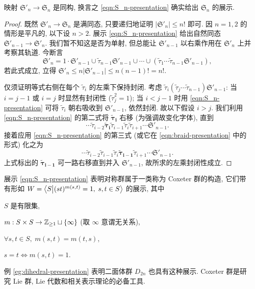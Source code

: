\begin{theorem}\label{prop:S_n-presentation}
	映射 $\mathfrak{S}'_n \to \mathfrak{S}_n$ 是同构, 换言之 \eqref{eqn:S_n-presentation} 确实给出 $\mathfrak{S}_n$ 的展示.
\end{theorem}
\begin{proof}
	既然 $\mathfrak{S}'_n \to \mathfrak{S}_n$ 是满同态, 只要递归地证明 $|\mathfrak{S}'_n| \leq n!$ 即可. 因 $n=1,2$ 的情形是平凡的, 以下设 $n > 2$. 展示 \eqref{eqn:S_n-presentation} 给出自然同态 $\mathfrak{S}'_{n-1} \to \mathfrak{S}'_n$. 我们暂不知这是否为单射, 但总能让 $\mathfrak{S}'_{n-1}$ 以右乘作用在 $\mathfrak{S}'_n$ 上并考察其轨道. 今断言
	\[ \mathfrak{S}'_n = 1 \cdot \mathfrak{S}'_{n-1} \cup \tilde{\tau}_{n-1}\mathfrak{S}'_{n-1} \cup \cdots \cup (\tilde{\tau}_1 \cdots \tilde{\tau}_{n-1} \mathfrak{S}'_{n-1}), \]
	若此式成立, 立得 $\mathfrak{S}'_n \leq n |\mathfrak{S}'_{n-1}| \leq n(n-1)! = n!$.
	
	仅须证明等式右侧在每个 $\tilde{\tau}_i$ 的左乘下保持封闭. 考虑 $\tilde{\tau}_i (\tilde{\tau}_j \cdots \tilde{\tau}_{n-1}) \mathfrak{S}'_{n-1}$: 当 $i=j-1$ 或 $i=j$ 时显然有封闭性 ($\tilde{\tau}_j^2 = 1$); 当 $i < j-1$ 时用 \eqref{eqn:S_n-presentation} 可将 $\tilde{\tau}_i$ 朝右吸收到 $\mathfrak{S}'_{n-1}$, 依然封闭. 故以下假设 $i>j$. 我们利用 \eqref{eqn:S_n-presentation} 的第二式将 $\bm{\tilde{\tau}_i}$ 右移 (为强调故变化字体), 直到
	\[ \cdots \tilde{\tau}_{i-2} \bm{\tilde{\tau}_i} \tilde{\tau}_{i-1} \tilde{\tau}_i \tilde{\tau}_{i+1} \cdots \mathfrak{S}'_{n-1}. \]
	接着应用 \eqref{eqn:S_n-presentation} 的第三式 (或它在 \eqref{eqn:braid-presentation} 中的形式) 化之为
	\[ \cdots \tilde{\tau}_{i-2} \tilde{\tau}_{i-1} \tilde{\tau}_i \bm{\tilde{\tau}_{i-1}} \tilde{\tau}_{i+1} \cdots \mathfrak{S}'_{n-1}. \]
	上式标出的 $\bm{\tilde{\tau}_{i-1}}$ 可一路右移直到并入 $\mathfrak{S}'_{n-1}$, 故所求的左乘封闭性成立.
\end{proof}

展示 \eqref{eqn:S_n-presentation} 表明对称群属于一类称为 Coxeter 群的构造, 它们带有形如 $W = \left\langle S \big| (st)^{m(s,t)}=1, \; s,t \in S \right\rangle$ 的展示, 其中
\begin{compactitem}
	\item $S$ 是有限集,
	\item $m: S \times S \to \mathbb{Z}_{\geq 1} \sqcup \{\infty\}$ (取 $\infty$ 意谓无关系),
	\item $\forall s,t \in S, \; m(s,t)=m(t,s)$,
	\item $s=t \iff m(s,t)=1$.
\end{compactitem}
例 \ref{eg:dihedral-presentation} 表明二面体群 $D_{2n}$ 也具有这种展示. Coxeter 群是研究 Lie 群, Lie 代数和相关表示理论的必备工具. 

